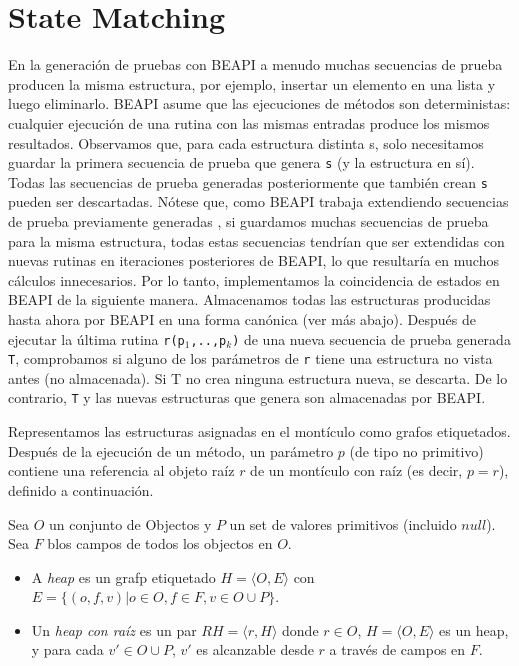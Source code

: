 \section{State Matching}
\label{sec:state-matching}

En la generación de pruebas con \textsf{BEAPI} a menudo muchas secuencias de prueba producen la misma estructura, por ejemplo, insertar un elemento en una lista y luego eliminarlo. \textsf{BEAPI} asume que las ejecuciones de métodos son deterministas: cualquier ejecución de una rutina con las mismas entradas produce los mismos resultados. Observamos que, para cada estructura distinta s, solo necesitamos guardar la primera secuencia de prueba que genera \texttt{s} (y la estructura en sí). Todas las secuencias de prueba generadas posteriormente que también crean \texttt{s} pueden ser descartadas. Nótese que, como \textsf{BEAPI} trabaja extendiendo secuencias de prueba previamente generadas %
, si guardamos muchas secuencias de prueba para la misma estructura, todas estas secuencias tendrían que ser extendidas con nuevas rutinas en iteraciones posteriores de \textsf{BEAPI}, lo que resultaría en muchos cálculos innecesarios. Por lo tanto, implementamos la coincidencia de estados en \textsf{BEAPI} de la siguiente manera. Almacenamos todas las estructuras producidas hasta ahora por \textsf{BEAPI} en una forma canónica (ver más abajo). Después de ejecutar la última rutina \texttt{r(p$_1$,..,p$_k$)} de una nueva secuencia de prueba generada \texttt{T}, comprobamos si alguno de los parámetros de \texttt{r} tiene una estructura no vista antes (no almacenada). Si T no crea ninguna estructura nueva, se descarta. De lo contrario, \texttt{T} y las nuevas estructuras que genera son almacenadas por \textsf{BEAPI}.

Representamos las estructuras asignadas en el montículo como grafos etiquetados. Después de la ejecución de un método, un parámetro $p$  (de tipo no primitivo) contiene una referencia al objeto raíz $r$ de un montículo con raíz (es decir,  $p=r$), definido a continuación.

\begin{definition}
    Sea $O$ un conjunto de Objectos y $P$ un set de valores primitivos (incluido $null$). Sea $F$ blos campos de todos los objectos en $O$. 
    \begin{itemize}
        \item A \emph{heap} es un grafp etiquetado $H = \langle O,E\rangle$ con $E = \{(o,f,v) | o \in O, f \in F, v \in O \cup P\}$.
        \item Un \emph{heap con raíz} es un par $RH = \langle r, H\rangle$ donde
            $r \in O$, $H = \langle O,E\rangle$ es un heap, y para cada $v' \in O \cup P$, $v'$ es alcanzable desde $r$ a través de campos en $F$.
    \end{itemize}
\end{definition}


